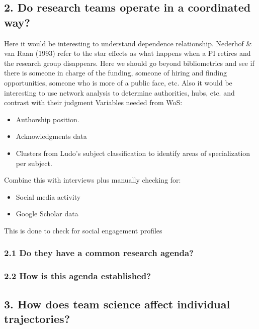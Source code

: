 \documentclass[]{article}
\providecommand{\tightlist}{%
  \setlength{\itemsep}{0pt}\setlength{\parskip}{0pt}}
\begin{document}
\hypertarget{do-research-teams-operate-in-a-coordinated-way}{%
\subsection{2. Do research teams operate in a coordinated
way?}\label{do-research-teams-operate-in-a-coordinated-way}}

Here it would be interesting to understand dependence relationship.
Nederhof \& van Raan (1993) refer to the star effects as what happens
when a PI retires and the research group disappears. Here we should go
beyond bibliometrics and see if there is someone in charge of the
funding, someone of hiring and finding opportunities, someone who is
more of a public face, etc. Also it would be interesting to use network
analysis to determine authorities, hubs, etc. and contrast with their
judgment Variables needed from WoS:

\begin{itemize}
\tightlist
\item
  Authorship position.
\item
  Acknowledgments data
\item
  Clusters from Ludo's subject classification to identify areas of
  specialization per subject.
\end{itemize}

Combine this with interviews plus manually checking for:

\begin{itemize}
\tightlist
\item
  Social media activity
\item
  Google Scholar data
\end{itemize}

This is done to check for social engagement profiles

\hypertarget{do-they-have-a-common-research-agenda}{%
\subsubsection{2.1 Do they have a common research
agenda?}\label{do-they-have-a-common-research-agenda}}

\hypertarget{how-is-this-agenda-established}{%
\subsubsection{2.2 How is this agenda
established?}\label{how-is-this-agenda-established}}

\hypertarget{how-does-team-science-affect-individual-trajectories}{%
\subsection{3. How does team science affect individual
trajectories?}\label{how-does-team-science-affect-individual-trajectories}}
\end{document}
